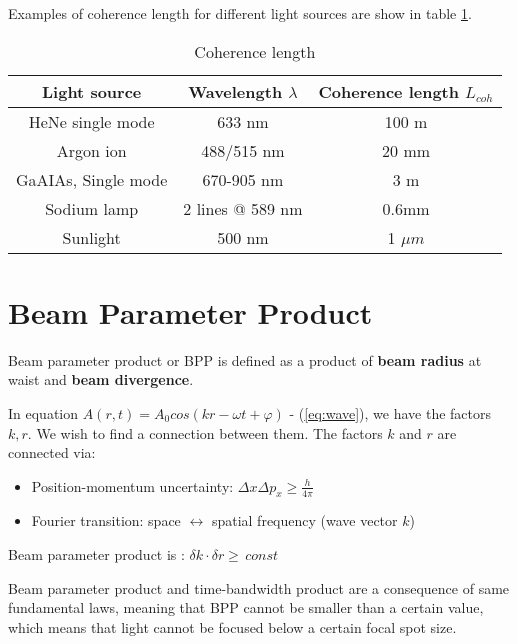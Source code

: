 Examples of coherence length for different light sources are show in table \ref{tab:clen}.
\begin{table}[h!]
    \centering
    \begin{tabular}{|c|c|c|}
        \hline
        Light source & Wavelength $\lambda$ & Coherence length $L_{coh}$ \\
        \hline
        HeNe single mode & 633 nm & 100 m \\
        \hline
        Argon ion & 488/515 nm & 20 mm \\
        \hline
        GaAIAs, Single mode& 670-905 nm & 3 m\\
        \hline
        Sodium lamp & 2 lines @ 589 nm & 0.6mm \\
        \hline  
        Sunlight & 500 nm & 1 $\mu m$ \\
        \hline     
    \end{tabular}
    \caption{Coherence length}
    \label{tab:clen}
\end{table}

\section{Beam Parameter Product}
Beam parameter product  or BPP is defined as a product of \textbf{beam radius} at waist and \textbf{beam divergence}.

In equation $A(r,t) = A_0 cos(kr - \omega t + \varphi)$ - (\ref{eq:wave}), we have the factors $k,r$. We wish to find a connection between them.
The factors $k$ and $r$ are connected via:
\begin{itemize}
    \item Position-momentum uncertainty: $\Delta x \Delta p_x \ge \frac{h}{4 \pi}$
    \item Fourier transition: space $\leftrightarrow$ spatial frequency (wave vector $k$)
\end{itemize}

Beam parameter product is : $\delta k \cdot \delta r \ge \, const$

Beam parameter product and time-bandwidth product are a consequence of same fundamental laws, meaning that BPP cannot be smaller
than a certain value, which means that light cannot be focused below a certain focal spot size.


